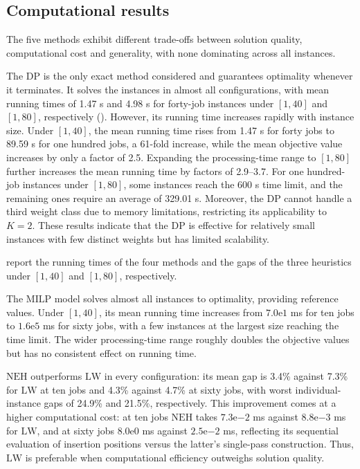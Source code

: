 ﻿\documentclass[12pt]{article} \textheight=24.5cm \textwidth=16.5cm \parskip = 0.165cm
\begin{document}
\begin{sloppypar}
        \subsection{Computational results} \label{sec:results}

        The five methods exhibit different trade-offs between solution quality, computational cost and generality, with none dominating across all instances.

        The $\mathrm{DP}$ is the only exact method considered and guarantees optimality whenever it terminates.
        It solves the instances in almost all configurations, with mean running times of 1.47 s and 4.98 s for forty-job instances under $[1,40]$ and $[1,80]$, respectively ().
        However, its running time increases rapidly with instance size.
        Under $[1,40]$, the mean running time rises from 1.47 s for forty jobs to 89.59 s for one hundred jobs, a 61-fold increase, while the mean objective value increases by only a factor of 2.5.
        Expanding the processing-time range to $[1,80]$ further increases the mean running time by factors of 2.9--3.7.
        For one hundred-job instances under $[1,80]$, some instances reach the 600 s time limit, and the remaining ones require an average of 329.01 s.
        Moreover, the $\mathrm{DP}$ cannot handle a third weight class due to memory limitations, restricting its applicability to $K=2$.
        These results indicate that the $\mathrm{DP}$ is effective for relatively small instances with few distinct weights but has limited scalability.

         report the running times of the four methods and the gaps of the three heuristics under $[1,40]$ and $[1,80]$, respectively.

        The $\mathrm{MILP}$ model solves almost all instances to optimality, providing reference values.
        Under $[1,40]$, its mean running time increases from $7.0\mathrm{e}1$ ms for ten jobs to $1.6\mathrm{e}5$ ms for sixty jobs, with a few instances at the largest size reaching the time limit.
        The wider processing-time range roughly doubles the objective values but has no consistent effect on running time.

        $\mathrm{NEH}$ outperforms $\mathrm{LW}$ in every configuration: its mean gap is 3.4\% against 7.3\% for $\mathrm{LW}$ at ten jobs and 4.3\% against 4.7\% at sixty jobs, with worst individual-instance gaps of 24.9\% and 21.5\%, respectively.
        This improvement comes at a higher computational cost: at ten jobs $\mathrm{NEH}$ takes $7.3\mathrm{e}{-2}$ ms against $8.8\mathrm{e}{-3}$ ms for $\mathrm{LW}$, and at sixty jobs $8.0\mathrm{e}0$ ms against $2.5\mathrm{e}{-2}$ ms, reflecting its sequential evaluation of insertion positions versus the latter's single-pass construction.
        Thus, $\mathrm{LW}$ is preferable when computational efficiency outweighs solution quality.


\end{sloppypar}
\end{document}
